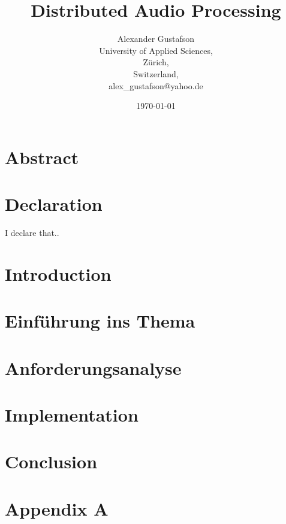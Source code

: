\documentclass{report}
\begin{document}
\title{Distributed Audio Processing}
\author{Alexander Gustafson\\
  University of Applied Sciences,\\
  Zürich,\\
  Switzerland,\\
  alex\_gustafson@yahoo.de}
\date{\today}
\maketitle

\chapter*{Abstract}


\chapter*{Declaration}
I declare that..

\tableofcontents

\chapter{Introduction}



\chapter{Einführung ins Thema}






\chapter{Anforderungsanalyse}


\chapter{Implementation}


\chapter{Conclusion}


{}


\chapter{Appendix A}


\end{document}
